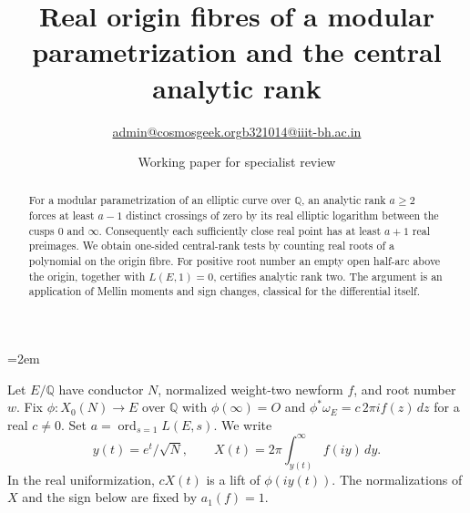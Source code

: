 \documentclass[11pt]{article}
\title{Real origin fibres of a modular parametrization and the central analytic rank}
\author{\small \href{mailto:admin@cosmosgeek.org}{admin@cosmosgeek.org}\qquad \href{mailto:b321014@iiit-bh.ac.in}{b321014@iiit-bh.ac.in}}
\date{Working paper for specialist review}
\begin{document}
\raggedbottom\emergencystretch=2em\maketitle
\begin{abstract}
For a modular parametrization of an elliptic curve over $\mathbb Q$,
an analytic rank $a\ge2$ forces at least $a-1$ distinct crossings of zero
by its real elliptic logarithm between the cusps $0$ and $\infty$.
Consequently each sufficiently close real point has at least $a+1$ real
preimages. We obtain one-sided central-rank tests by counting real roots
of a polynomial on the origin fibre. For positive root number an empty
open half-arc above the origin, together with $L(E,1)=0$, certifies
analytic rank two. The argument is an application of Mellin moments
and sign changes, classical for the differential itself.
\end{abstract}
Let $E/\mathbb Q$ have conductor $N$, normalized weight-two newform
$f$, and root number $w$. Fix $\phi:X_0(N)\to E$ over $\mathbb Q$ with
$\phi(\infty)=O$ and $\phi^*\omega_E=c\,2\pi i f(z)\,dz$ for a real
$c\ne0$. Set $a=\operatorname{ord}_{s=1}L(E,s)$. We write
\[
 y(t)=e^t/\sqrt N,\qquad X(t)=2\pi\int_{y(t)}^\infty f(iy)\,dy .
\]
In the real uniformization, $cX(t)$ is a lift of $\phi(iy(t))$.
The normalizations of $X$ and the sign below are fixed by $a_1(f)=1$.
\end{document}
